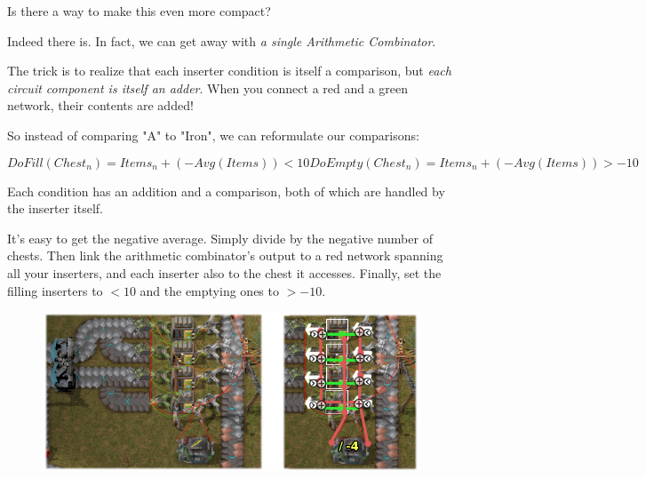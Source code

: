 \documentclass{article}
\begin{document}
Is there a way to make this even more compact?

Indeed there is. In fact, we can get away with \emph{a single Arithmetic Combinator}.

The trick is to realize that each inserter condition is itself a comparison, but \emph{each circuit component is itself an adder}. When you connect a red and a green network, their contents are added!

So instead of comparing "A" to "Iron", we can reformulate our comparisons:

$$
DoFill(Chest_n) = Items_n + (-Avg(Items)) \lt 10

DoEmpty(Chest_n) = Items_n + (-Avg(Items)) \gt -10
$$

Each condition has an addition and a comparison, both of which are handled by the inserter itself.

It's easy to get the negative average. Simply divide by the negative number of chests. Then link the
arithmetic combinator's output to a red network spanning all your inserters, and each inserter also to the
chest it accesses. Finally, set the filling inserters to $<10$ and the emptying ones to $>-10$.

\begin{figure}
\includegraphics{balancer.png}
\label{And that's how it works.}
\end{figure}
\end{document}
